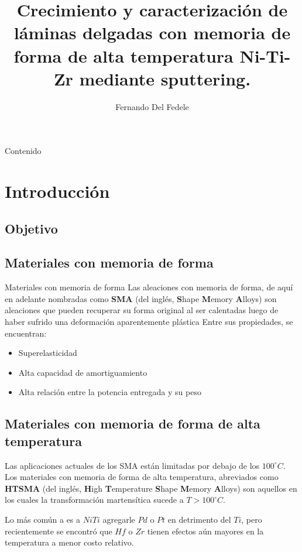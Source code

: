 \documentclass[11pt]{beamer}
\author{Fernando Del Fedele}
\title{Crecimiento y caracterización de
láminas delgadas con memoria de
forma de alta temperatura Ni-Ti-Zr
mediante sputtering.}
\begin{document}
\begin{frame}
\titlepage
\end{frame}

\begin{frame}{Contenido}
\tableofcontents
\end{frame}

\section{Introducción}
\subsection{Objetivo}
\subsection{Materiales con memoria de forma}
\begin{frame}{Materiales con memoria de forma}
Las aleaciones con memoria de forma, de aquí en adelante nombradas como \textbf{SMA} (del inglés, \textbf{S}hape \textbf{M}emory \textbf{A}lloys) son aleaciones que pueden recuperar su forma original al ser calentadas luego de haber sufrido una deformación aparentemente plástica
Entre sus propiedades, se encuentran:
\begin{itemize}
	\item Superelasticidad
	\item Alta capacidad de amortiguamiento
	\item Alta relación entre la potencia entregada y su peso
\end{itemize}
\end{frame}
\subsection{Materiales con memoria de forma de alta temperatura}
\begin{frame}
Las aplicaciones actuales de los SMA están limitadas por debajo de los $100^\circ C$. Los materiales con memoria de forma de alta temperatura, abreviados como \textbf{HTSMA} (del inglés, \textbf{H}igh \textbf{T}emperature \textbf{S}hape \textbf{M}emory \textbf{A}lloys) son aquellos en los cuales la transformación martensítica sucede a $T > 100^\circ C$.

Lo más común a es a $NiTi$ agregarle $Pd$ o $Pt$ en detrimento del $Ti$, pero recientemente se encontró que $Hf$ o $Zr$ tienen efectos aún mayores en la temperatura a menor costo relativo.
\end{frame}
\end{document}
